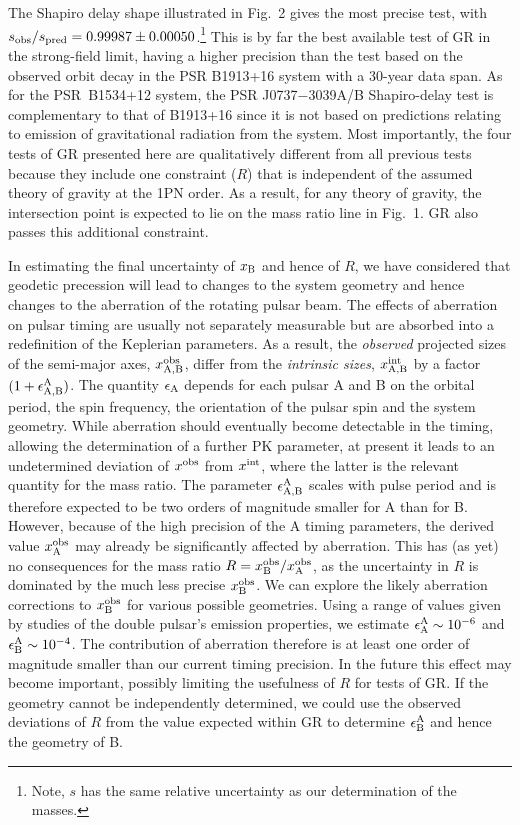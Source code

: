 \documentclass[12pt,psfig]{article}
\begin{document}
The
Shapiro delay shape illustrated in Fig.~2 gives the most precise test,
with $s_{\rm obs}/s_{\rm pred} = 0.99987\pm0.00050$.\footnote{
Note, $s$ has the same relative uncertainty as our determination of the
masses.}  This is by far
the best available test of GR in the strong-field limit, having a
higher precision than the test based on the observed orbit decay in
the PSR B1913+16 system with a 30-year data span\cite{wt05}. As for
the PSR~B1534+12 system\cite{sttw02}, the PSR J0737$-$3039A/B
Shapiro-delay test is complementary to that of B1913+16 since it is
not based on predictions relating to emission of gravitational
radiation from the system\cite{twdw92}. Most importantly, the four
tests of GR presented here are qualitatively different
from all previous tests because they include one constraint ($R$) that
is independent of the assumed theory of gravity at the 1PN order. As
a result, for any theory of gravity, the intersection point is expected
to lie on the mass ratio line in Fig.~1. GR also passes this 
additional constraint.
 

In estimating the final uncertainty of $x_{\rm{B}}$ and hence of $R$, we have
considered that geodetic precession will lead to changes to the system
geometry and hence changes to the aberration of the rotating pulsar beam.  The
effects of aberration on pulsar timing are usually not separately measurable
but are absorbed into a redefinition of the Keplerian parameters. As a result,
the {\em observed} projected sizes of the semi-major axes, $x^{\rm obs}_{\rm
  A, B}$, differ from the {\em intrinsic sizes}, $x^{\rm int}_{\rm A, B}$ by a
factor $(1+\epsilon^{\rm A}_{\rm A, B})$. The quantity $\epsilon_{\rm A}$
depends for each pulsar A and B on the orbital period, the spin frequency,
the orientation of the pulsar spin and the
system geometry\cite{dt92}. While aberration should
eventually become detectable in the timing, allowing the determination of a
further PK parameter, at present it leads to an undetermined deviation of
$x^{\rm obs}$ from $x^{\rm int}$, where the latter is the relevant quantity
for the mass ratio. The parameter $\epsilon^{\rm A}_{\rm A, B}$ scales with
pulse period and is therefore expected to be two orders of magnitude smaller
for A than for B. However, because of the high precision of the A timing
parameters, the derived value $x^{\rm obs}_{\rm A}$ may already be
significantly affected by aberration. This has (as yet) no consequences for
the mass ratio $R=x^{\rm obs}_{\rm B}/x^{\rm obs}_{\rm A}$, as the uncertainty
in $R$ is dominated by the much less precise $x^{\rm obs}_{\rm B}$. We can
explore the likely aberration corrections to $x^{\rm obs}_{\rm B}$ for various
possible geometries. Using a range of values given by studies of the double
pulsar's emission properties\cite{lyu05}, we estimate $\epsilon^{\rm A}_{\rm
  A} \sim 10^{-6}$ and $\epsilon^{\rm A}_{\rm B} \sim 10^{-4}$. The
contribution of aberration therefore is at least one order of magnitude
smaller than our current timing precision.  In the future this effect may
become important, possibly limiting the usefulness of $R$ for tests of GR. If
the geometry cannot be independently determined, we could use the observed
deviations of $R$ from the value expected within GR to determine
$\epsilon^{\rm A}_{\rm B}$ and hence the geometry of B.
\end{document}
